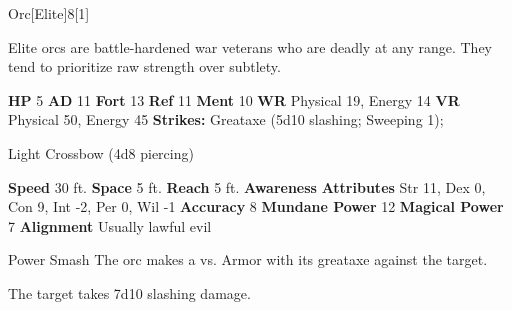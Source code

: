   \begin{monsection}{Orc}[Elite]{8}[1]
    \vspace{-1em}\vspace{-1em}
    \vspace{0em}

    
      Elite orcs are battle-hardened war veterans who are deadly at any range.
      They tend to prioritize raw strength over subtlety.
    
    

    \begin{spellcontent}
      \begin{spelltargetinginfo}
        \pari \textbf{HP} 5 \monsep
          \textbf{AD} 11 \monsep
          \textbf{Fort} 13 \monsep
          \textbf{Ref} 11 \monsep
          \textbf{Ment} 10
        \pari \textbf{WR} Physical 19, Energy 14 \monsep
        \textbf{VR} Physical 50, Energy 45
        \pari \textbf{Strikes:}
            Greataxe  (5d10 slashing; Sweeping 1);
\par Light Crossbow  (4d8 piercing)
      \end{spelltargetinginfo}
    \end{spellcontent}
    \begin{monsterfooter}
      \pari \textbf{Speed} 30 ft. \monsep
        \textbf{Space} 5 ft. \monsep
        \textbf{Reach} 5 ft.
      \pari \textbf{Awareness} 
      \pari \textbf{Attributes}
        Str 11, Dex 0,
        Con 9, Int -2,
        Per 0, Wil -1
      \pari \textbf{Accuracy} 8 \monsep
        \textbf{Mundane Power} 12 \monsep
      \textbf{Magical Power} 7
      \pari \textbf{Alignment} Usually lawful evil
    \end{monsterfooter}
  \end{monsection}
  \begin{freeability}{Power Smash}
       The orc makes a 
         vs. Armor
        with its greataxe against the target.
    
    \hit The target takes 7d10 slashing damage.
    \end{freeability}
  
